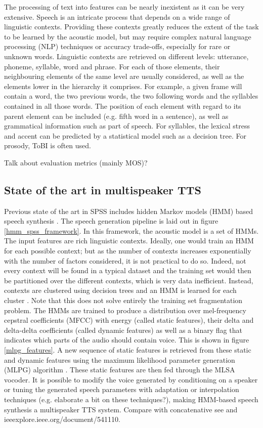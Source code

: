 \documentclass[a4paper, oneside]{article}
\begin{document}
The processing of text into features can be nearly inexistent as it can be very extensive. Speech is an intricate process that depends on a wide range of linguistic contexts. Providing these contexts greatly reduces the extent of the task to be learned by the acoustic model, but may require complex natural language processing (NLP) techniques or accuracy trade-offs, especially for rare or unknown words. Linguistic contexts are retrieved on different levels: utterance, phoneme, syllable, word and phrase. For each of those elements, their neighbouring elements of the same level are usually considered, as well as the elements lower in the hierarchy it comprises. For example, a given frame will contain a word, the two previous words, the two following words and the syllables contained in all those words. The position of each element with regard to its parent element can be included (e.g. fifth word in a sentence), as well as grammatical information such as part of speech. For syllables, the lexical stress and accent can be predicted by a statistical model such as a decision tree. For prosody, ToBI \cite{TOBI} is often used.

\color{red}Talk about evaluation metrics (mainly MOS)?\color{black}

\subsection{State of the art in multispeaker TTS}
Previous state of the art in SPSS includes hidden Markov models (HMM) based speech synthesis \cite{Tokuda-2013}. The speech generation pipeline is laid out in figure \ref{hmm_spss_framework}. In this framework, the acoustic model is a set of HMMs. The input features are rich linguistic contexts. Ideally, one would train an HMM for each possible context; but as the number of contexts increases exponentially with the number of factors considered, it is not practical to do so. Indeed, not every context will be found in a typical dataset and the training set would then be partitioned over the different contexts, which is very data inefficient. Instead, contexts are clustered using decision trees and an HMM is learned for each cluster \cite{HMMTTS}. Note that this does not solve entirely the training set fragmentation problem. The HMMs are trained to produce a distribution over mel-frequency cepstral coefficients (MFCC) with energy (called static features), their delta and delta-delta coefficients (called dynamic features) as well as a binary flag that indicates which parts of the audio should contain voice. This is shown in figure \ref{mlpg_features}. A new sequence of static features is retrieved from these static and dynamic features using the maximum likelihood parameter generation (MLPG) algorithm \cite{Tokuda-2000}. These static features are then fed through the MLSA \cite{MLSA} vocoder. It is possible to modify the voice generated by conditioning on a speaker or tuning the generated speech parameters with adaptation or interpolation techniques (e.g. \cite{HMMSpeakerInterpolation} \color{red} elaborate a bit on these techniques?\color{black}), making HMM-based speech synthesis a multispeaker TTS system. \color{red} Compare with concatenative see \cite{SPSSDNN} and ieeexplore.ieee.org/document/541110.\color{black}
\end{document}
